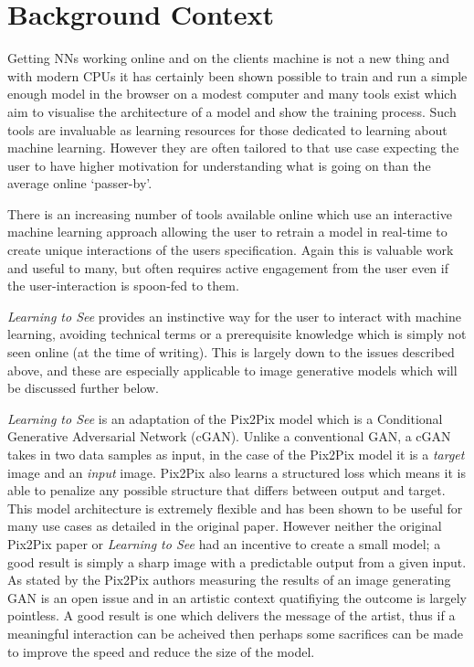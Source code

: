 \documentclass{article}
\begin{document}
\section{Background Context}

Getting NNs working online and on the clients machine is not a new thing and with modern CPUs it has certainly been shown possible to train and run a simple enough model in the browser on a modest computer\cite{karparthy_conjs_2016, brainjs, synaptic, mind, kerasjs} and many tools exist which aim to visualise the architecture of a model and show the training process\cite{broad_cnn_vis_2016, tensorflow_playground, 1704.01942}. Such tools are invaluable as learning resources for those dedicated to learning about machine learning. However they are often tailored to that use case expecting the user to have higher motivation for understanding what is going on than the average online `passer-by'.

There is an increasing number of tools available online which use an interactive machine learning approach allowing the user to retrain a model in real-time to create unique interactions of the users specification\cite{magenta, mimic, teachablemachines}. Again this is valuable work and useful to many, but often requires active engagement from the user even if the user-interaction is spoon-fed to them.

\textit{Learning to See} provides an instinctive way for the user to interact with machine learning, avoiding technical terms or a prerequisite knowledge which is simply not seen online (at the time of writing). This is largely down to the issues described above, and these are especially applicable to image generative models which will be discussed further below.

\textit{Learning to See} is an adaptation of the Pix2Pix model\cite{1611.07004} which is a Conditional Generative Adversarial Network (cGAN)\cite{1701.00160}. Unlike a conventional GAN\cite{1406.2661}, a cGAN takes in two data samples as input, in the case of the Pix2Pix model it is a \textit{target} image and an \textit{input} image. Pix2Pix also learns a structured loss which means it is able to penalize any possible structure that differs between output and target\cite{1611.07004}. This model architecture is extremely flexible and has been shown to be useful for many use cases as detailed in the original paper. However neither the original Pix2Pix paper or \textit{Learning to See} had an incentive to create a small model; a good result is simply a sharp image with a predictable output from a given input. As stated by the Pix2Pix authors measuring the results of an image generating GAN is an open issue\cite{1606.03498, 1611.07004} and in an artistic context quatifiying the outcome is largely pointless. A good result is one which delivers the message of the artist, thus if a meaningful interaction can be acheived then perhaps some sacrifices can be made to improve the speed and reduce the size of the model.
\end{document}
